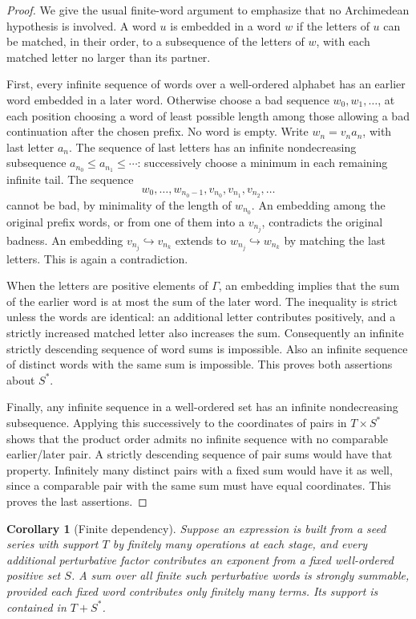 \documentclass[11pt,a4paper]{article}
\numberwithin{equation}{section}
\newtheorem{corollary}[corollary]{Corollary}
\theoremstyle{definition}
\theoremstyle{remark}
\begin{document}
\begin{proof}
We give the usual finite-word argument to emphasize that no Archimedean
hypothesis is involved.  A word $u$ is embedded in a word $w$ if the letters
of $u$ can be matched, in their order, to a subsequence of the letters of
$w$, with each matched letter no larger than its partner.

First, every infinite sequence of words over a well-ordered alphabet has
an earlier word embedded in a later word.  Otherwise choose a bad sequence
$w_0,w_1,\ldots$, at each position choosing a word of least possible length
among those allowing a bad continuation after the chosen prefix.  No word
is empty.  Write $w_n=v_n a_n$, with last letter $a_n$.  The sequence of
last letters has an infinite nondecreasing subsequence
$a_{n_0}\leq a_{n_1}\leq\cdots$: successively choose a minimum in each
remaining infinite tail.  The sequence
\[
 w_0,\ldots,w_{n_0-1},v_{n_0},v_{n_1},v_{n_2},\ldots
\]
cannot be bad, by minimality of the length of $w_{n_0}$.  An embedding
among the original prefix words, or from one of them into a $v_{n_j}$,
contradicts the original badness.  An embedding $v_{n_j}\hookrightarrow
v_{n_k}$ extends to $w_{n_j}\hookrightarrow w_{n_k}$ by matching the last
letters.  This is again a contradiction.

When the letters are positive elements of $\Gamma$, an embedding implies
that the sum of the earlier word is at most the sum of the later word.
The inequality is strict unless the words are identical: an additional
letter contributes positively, and a strictly increased matched letter
also increases the sum.  Consequently an infinite strictly descending
sequence of word sums is impossible.  Also an infinite sequence of distinct
words with the same sum is impossible.  This proves both assertions about
$S^*$.

Finally, any infinite sequence in a well-ordered set has an infinite
nondecreasing subsequence.  Applying this successively to the coordinates
of pairs in $T\times S^*$ shows that the product order admits no infinite
sequence with no comparable earlier/later pair.  A strictly descending
sequence of pair sums would have that property.  Infinitely many distinct
pairs with a fixed sum would have it as well, since a comparable pair with
the same sum must have equal coordinates.  This proves the last assertions.
\end{proof}

\begin{corollary}[Finite dependency]\label{cor:dependency}
Suppose an expression is built from a seed series with support $T$ by
finitely many operations at each stage, and every additional perturbative
factor contributes an exponent from a fixed well-ordered positive set
$S$.  A sum over all finite such perturbative words is strongly summable,
provided each fixed word contributes only finitely many terms.  Its support
is contained in $T+S^*$.
\end{corollary}
\end{document}

